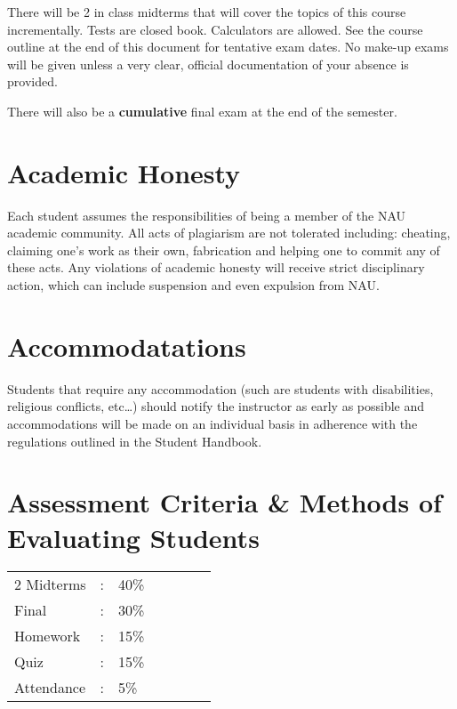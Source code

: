\documentclass[handout]{ximera}
\begin{document}
There will be 2 in class midterms that will cover the topics of this course incrementally. Tests are closed book. Calculators are allowed. See the course outline at the end of this document for tentative exam dates. No make-up exams will be given unless a very clear, official documentation of your absence is provided.

There will also be a {\bf cumulative} final exam at the end of the semester.

\section*{Academic Honesty}

Each student assumes the responsibilities of being a member of the NAU academic community.  All acts of plagiarism are not tolerated including: cheating, claiming one’s work as their own, fabrication and helping one to commit any of these acts.  Any violations of academic honesty will receive strict disciplinary action, which can include suspension and even expulsion from NAU.  

\section*{Accommodatations}

Students that require any accommodation (such are students with disabilities, religious conflicts, etc…) should notify the instructor as early as possible and accommodations will be made on an individual basis in adherence with the regulations outlined in the Student Handbook.

\section*{Assessment Criteria \& Methods of Evaluating Students}

\begin{tabular}[c]{lllcccl}
2 Midterms  & : & 40\% & \,\hspace{2cm} &  & & \\  
Final & : & 30\% & \hspace{2cm} & & & \\  
Homework & : & 15\% & \hspace{2cm} & & & \\  
Quiz & : & 15\% & \hspace{2cm} & &\\  
Attendance & : & 5\% & \hspace{2cm} & &  & \\  
\end{tabular}
\end{document}
